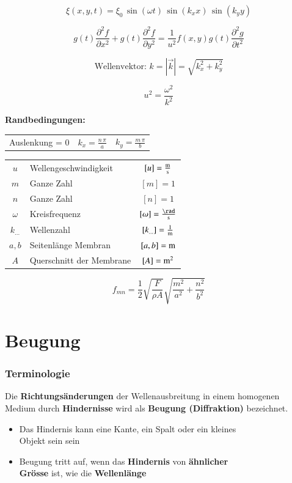\hfill
\begin{minipage}{0.68\linewidth}
	$$ \boxed{ \xi(x,y,t) = \xi_0 \, \sin(\omega t) \, \sin(k_x x) \, \sin(k_y y)  } $$

	$$ \boxed{ g(t)\frac{\partial^2f}{\partial x^2} + g(t)\frac{\partial^2f}{\partial y^2} = \frac{1}{u^2}f(x,y)g(t)\frac{\partial^2g}{\partial t^2} } $$

	$$ \boxed{ \text{Wellenvektor: } k = |\vec{k}| = \sqrt{k_x^2 + k_y^2}} $$

	$$ \boxed{ u^2 = \frac{\omega^2}{k^2}} $$
\end{minipage}

\textbf{Randbedingungen:} %
\begin{tabular}{l c c }
	Auslenkung = 0 &  $ \boxed{ k_x = \frac{n \, \pi}{a} }$ & $ \boxed{ k_y = \frac{m \, \pi}{b} }$
\end{tabular} 

\begin{minipage}{0.45\linewidth}
	\begin{tabular}{clc}
		$u$ & Wellengeschwindigkeit & $[u] = \frac{\mathrm{m}}{\mathrm{s}}$ \\
		$m$ & Ganze Zahl & $[m] = 1$ \\
		$n$ & Ganze Zahl & $[n] = 1$ \\
		$\omega$ & Kreisfrequenz & $[\omega] = \frac{\rad}{\s}$ \\
		$k_{...}$ & Wellenzahl & $[k_{...}] = \frac{1}{\mathrm{m}} $ \\
		$a,b$ & Seitenlänge Membran & $[a,b] = \mathrm{m}$ \\
		$A$ & Querschnitt der Membrane & $[A] = \mathrm{m}^2$
	\end{tabular}
\end{minipage}
\hfill
\begin{minipage}{0.45\linewidth}
	$$ \boxed{f_{mn} = \frac{1}{2}\sqrt{\frac{F}{\rho A}}\sqrt{\frac{m^2}{a^2} + \frac{n^2}{b^2}}} $$
\end{minipage}



\section{Beugung}

\subsubsection{Terminologie}

Die \textbf{Richtungsänderungen} der Wellenausbreitung in einem homogenen Medium durch \textbf{Hindernisse} wird als \textbf{Beugung (Diffraktion)} bezeichnet. \\
\begin{itemize}
	\item Das Hindernis kann eine Kante, ein Spalt oder ein kleines \\
	Objekt sein sein 
	\item Beugung tritt auf, wenn das \textbf{Hindernis} von \textbf{ähnlicher}\\
	\textbf{Grösse} ist, wie die \textbf{Wellenlänge} 
\end{itemize}


